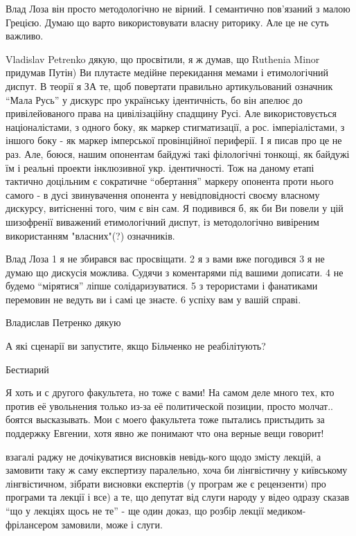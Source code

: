 \begin{itemize}
Влад Лоза він просто методологічно не вірний. І семантично пов'язаний з малою
Грецією. Думаю що варто використовувати власну риторику. Але це не суть
важливо.


Vladislav Petrenko дякую, що просвітили, я ж думав, що Ruthenia Minor придумав
Путін) Ви плутаєте медійне перекидання мемами і етимологічний диспут. В теорії
я ЗА те, щоб повертати правильно артикульований означник \enquote{Мала Русь} у дискурс
про українську ідентичність, бо він апелює до привілейованого права на
цивілізаційну спадщину Русі. Але використовується націоналістами, з одного
боку, як маркер стигматизації, а рос. імперіалістами, з іншого боку - як маркер
імперської провінційної периферії. І я писав про це не раз. Але, боюся, нашим
опонентам байдужі такі філологічні тонкощі, як байдужі їм і реальні проекти
інклюзивної укр. ідентичності. Тож на даному етапі тактично доцільним є
сократичне \enquote{обертання} маркеру опонента проти нього самого - в дусі
звинувачення опонента у невідповідності своєму власному дискурсу, витісненні
того, чим є він сам. Я подивився б, як би Ви повели у цій шизофренії виважений
етимологічний диспут, із методологічно вивіреним використанням "власних"(?)
означників.


Влад Лоза 1 я не збирався вас просвіщати. 2 я з вами вже погодився 3 я не думаю
що дискусія можлива. Судячи з коментарями під вашими дописати. 4 не будемо
\enquote{мірятися} ліпше солідаризуватися. 5 з терористами і фанатиками перемовин не
ведуть ви і самі це знаєте. 6 успіху вам у вашій справі.

Владислав Петренко дякую


А які сценарії ви запустите, якщо Більченко не реабілітують?


Бестиарий


Я хоть и с другого факультета, но тоже с вами! На самом деле много тех, кто
против её увольнения только из-за её политической позиции, просто молчат..
боятся высказывать. Мои с моего факультета тоже пытались пристыдить за
поддержку Евгении, хотя явно же понимают что она верные вещи говорит!


взагалі раджу не дочікуватися висновків невідь-кого щодо змісту лекцій, а
замовити таку ж саму експертизу паралельно, хоча би лінгвістичну у київському
лінгвістичном, зібрати висновки експертів (у програм же є рецензенти) про
програми та лекції і все) а те, що депутат від слуги народу у відео одразу
сказав \enquote{що у лекціях щось не те} - ще один доказ, що розбір лекції
медиком-фрілансером замовили, може і слуги.


\end{itemize}
